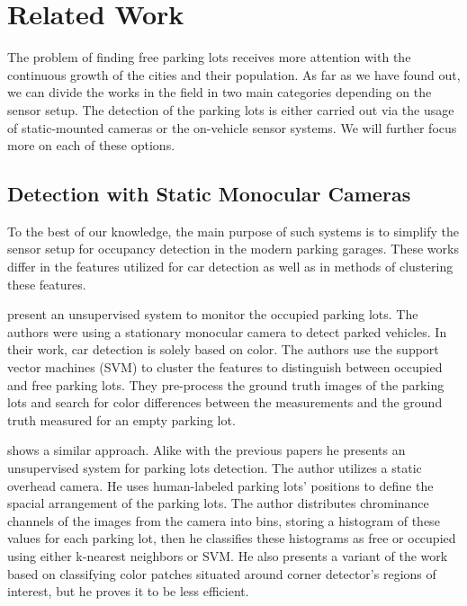 \chapter{Related Work}
\label{cha:related_works}

The problem of finding free parking lots receives more attention with the
continuous growth of the cities and their population. As far as we have found
out, we can divide the works in the field in two main categories depending on
the sensor setup. The detection of the parking lots is either carried out via
the usage of static-mounted cameras or the on-vehicle sensor systems. We will
further focus more on each of these options.

\section{Detection with Static Monocular Cameras} %
\label{sec:detection_with_monocular_cameras}

To the best of our knowledge, the main purpose of such systems is to simplify
the sensor setup for occupancy detection in the modern parking garages. These
works differ in the features utilized for car detection as well as in methods
of clustering these features.

\citet{qizhang06} present an unsupervised system to monitor the occupied
parking lots. The authors were using a stationary monocular camera to detect
parked vehicles. In their work, car detection is solely based on color. The
authors use the support vector machines (SVM) to cluster the features to
distinguish between occupied and free parking lots. They pre-process the
ground truth images of the parking lots and search for color differences
between the measurements and the ground truth measured for an empty parking
lot.

\citet{nicolastrue} shows a similar approach. Alike with the previous papers
he presents an unsupervised system for parking lots detection. The author
utilizes a static overhead camera. He uses human-labeled parking lots'
positions to define the spacial arrangement of the parking lots. The author
distributes chrominance channels of the images from the camera into bins,
storing a histogram of these values for each parking lot, then he classifies
these histograms as free or occupied using either k-nearest neighbors or
SVM\@. He also presents a variant of the work based on classifying color
patches situated around corner detector's regions of interest, but he proves
it to be less efficient.

